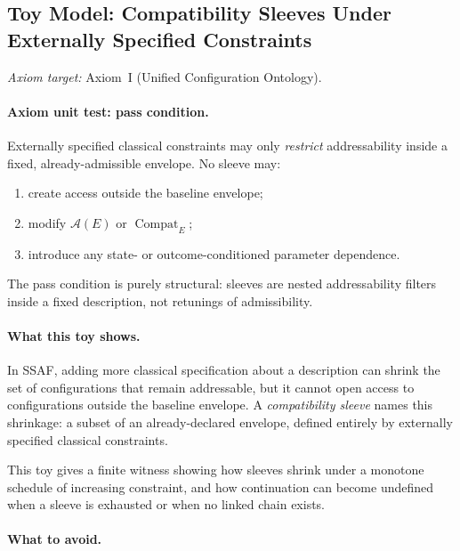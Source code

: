 \documentclass[aps,prx,onecolumn,11pt]{revtex4-2}
\theoremstyle{plain}
\theoremstyle{definition}
\theoremstyle{remark}
\newcommand{\Compat}{\operatorname{Compat}} %
\begin{document}
\subsection{Toy Model: Compatibility Sleeves Under Externally Specified Constraints}
\label{toy:compatibility_sleeves}

\noindent\emph{Axiom target:} Axiom~I (Unified Configuration Ontology).

\paragraph{Axiom unit test: pass condition.}

Externally specified classical constraints may only \emph{restrict}
addressability inside a fixed, already-admissible envelope. No sleeve
may:

\begin{enumerate}[label=(\roman*), leftmargin=2.2em]
\item create access outside the baseline envelope;
\item modify \(\mathcal A(E)\) or \(\Compat_E\);
\item introduce any state- or outcome-conditioned parameter dependence.
\end{enumerate}

The pass condition is purely structural: sleeves are nested
addressability filters inside a fixed description, not retunings of
admissibility.

\paragraph{What this toy shows.}

In SSAF, adding more classical specification about a description can
shrink the set of configurations that remain addressable, but it cannot
open access to configurations outside the baseline envelope. A
\emph{compatibility sleeve} names this shrinkage: a subset of an
already-declared envelope, defined entirely by externally specified
classical constraints.

This toy gives a finite witness showing how sleeves shrink under a
monotone schedule of increasing constraint, and how continuation can
become undefined when a sleeve is exhausted or when no linked chain
exists.

\paragraph{What to avoid.}
\end{document}
